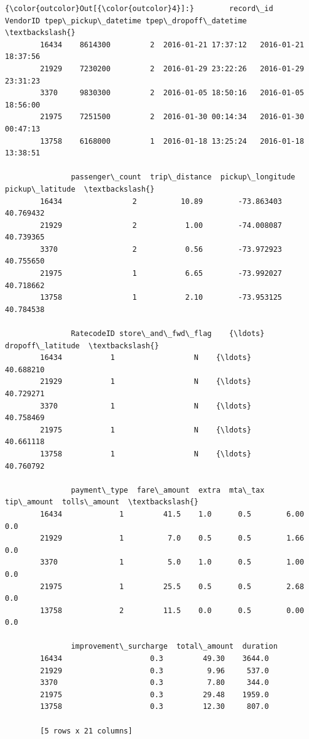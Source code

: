 \documentclass[11pt]{article}
\begin{document}
\begin{Verbatim}[commandchars=\\\{\}]
{\color{outcolor}Out[{\color{outcolor}4}]:}        record\_id  VendorID tpep\_pickup\_datetime tpep\_dropoff\_datetime  \textbackslash{}
        16434    8614300         2  2016-01-21 17:37:12   2016-01-21 18:37:56   
        21929    7230200         2  2016-01-29 23:22:26   2016-01-29 23:31:23   
        3370     9830300         2  2016-01-05 18:50:16   2016-01-05 18:56:00   
        21975    7251500         2  2016-01-30 00:14:34   2016-01-30 00:47:13   
        13758    6168000         1  2016-01-18 13:25:24   2016-01-18 13:38:51   
        
               passenger\_count  trip\_distance  pickup\_longitude  pickup\_latitude  \textbackslash{}
        16434                2          10.89        -73.863403        40.769432   
        21929                2           1.00        -74.008087        40.739365   
        3370                 2           0.56        -73.972923        40.755650   
        21975                1           6.65        -73.992027        40.718662   
        13758                1           2.10        -73.953125        40.784538   
        
               RatecodeID store\_and\_fwd\_flag    {\ldots}     dropoff\_latitude  \textbackslash{}
        16434           1                  N    {\ldots}            40.688210   
        21929           1                  N    {\ldots}            40.729271   
        3370            1                  N    {\ldots}            40.758469   
        21975           1                  N    {\ldots}            40.661118   
        13758           1                  N    {\ldots}            40.760792   
        
               payment\_type  fare\_amount  extra  mta\_tax  tip\_amount  tolls\_amount  \textbackslash{}
        16434             1         41.5    1.0      0.5        6.00           0.0   
        21929             1          7.0    0.5      0.5        1.66           0.0   
        3370              1          5.0    1.0      0.5        1.00           0.0   
        21975             1         25.5    0.5      0.5        2.68           0.0   
        13758             2         11.5    0.0      0.5        0.00           0.0   
        
               improvement\_surcharge  total\_amount  duration  
        16434                    0.3         49.30    3644.0  
        21929                    0.3          9.96     537.0  
        3370                     0.3          7.80     344.0  
        21975                    0.3         29.48    1959.0  
        13758                    0.3         12.30     807.0  
        
        [5 rows x 21 columns]
\end{Verbatim}
            
\end{document}
